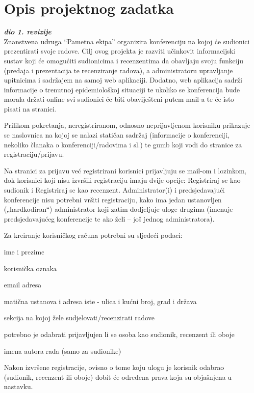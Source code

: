 \chapter{Opis projektnog zadatka}
		
		\textbf{\textit{dio 1. revizije}}\\

		Znanstvena udruga “Pametna ekipa” organizira konferenciju na kojoj će sudionici prezentirati svoje radove. Cilj ovog projekta je razviti učinkovit informacijski sustav koji će omogućiti sudionicima i recenzentima da obavljaju svoju funkciju (predaja i prezentacija te recenziranje radova), a administratoru upravljanje upitnicima i sadržajem na samoj web aplikaciji. Dodatno, web aplikacija sadrži informacije o trenutnoj epidemiološkoj situaciji te ukoliko se konferencija bude morala držati online svi sudionici će biti obaviješteni putem mail-a te će isto pisati na stranici.

		Prilikom pokretanja, neregistriranom, odnosno neprijavljenom korisniku prikazuje se naslovnica na kojoj se nalazi statičan sadržaj (informacije o konferenciji, nekoliko članaka o konferenciji/radovima i sl.) te gumb koji vodi do stranice za registraciju/prijavu.

		Na stranici za prijavu već registrirani korisnici prijavljuju se mail-om i lozinkom, dok korisnici koji nisu izvršili registraciju imaju dvije opcije: Registriraj se kao sudionik i Registriraj se kao recenzent. Administrator(i) i predsjedavajući konferencije nisu potrebni vršiti registraciju, kako ima jedan ustanovljen („hardkodiran“) administrator koji zatim dodjeljuje uloge drugima (imenuje predsjedavajućeg konferencije te ako želi – još jednog administratora).

		Za kreiranje korisničkog računa potrebni su sljedeći podaci:

		\begin{packed_item}

			\item ime i prezime
			\item korisnička oznaka
			\item email adresa
			\item matična ustanova i adresa iste - ulica i kućni broj, grad i država
			\item sekcija na kojoj žele sudjelovati/recenzirati radove
			\item potrebno je odabrati prijavljujen li se osoba kao sudionik, recenzent ili oboje
			\item imena autora rada (samo za sudionike)
		
		\end{packed_item}

		Nakon izvršene registracije, ovisno o tome koju ulogu je korisnik odabrao (sudionik, recenzent ili oboje) dobit će određena prava koja su objašnjena u nastavku.
		
		\eject
		
	